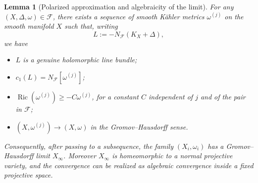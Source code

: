 \documentclass[11pt]{amsart}
\newtheorem{lemma}[theorem]{Lemma}
\theoremstyle{definition}
\theoremstyle{remark}
\begin{document}
\begin{lemma}[Polarized approximation and algebraicity of the limit]
\label{lem:polarized-approximation}
For any $(X,\Delta,\omega)\in\mathcal F$, there exists a sequence of smooth
K\"ahler metrics $\omega^{(j)}$ on the smooth manifold $X$ such that, writing
\[
        L:=-N_{\mathcal F}(K_X+\Delta),
\]
we have
\begin{itemize}
    \item $L$ is a genuine holomorphic line bundle;
    \item $c_1(L)=N_{\mathcal F}[\omega^{(j)}]$;
    \item $\operatorname{Ric}(\omega^{(j)})\geq -C\omega^{(j)}$, for a constant
    $C$ independent of $j$ and of the pair in $\mathcal F$;
    \item $(X,\omega^{(j)})\to (X,\omega)$ in the Gromov--Hausdorff sense.
\end{itemize}
Consequently, after passing to a subsequence, the family
$(X_i,\omega_i)$ has a Gromov--Hausdorff limit $X_\infty$. Moreover
$X_\infty$ is homeomorphic to a normal projective variety, and the convergence
can be realized as algebraic convergence inside a fixed projective space.
\end{lemma}
\end{document}
